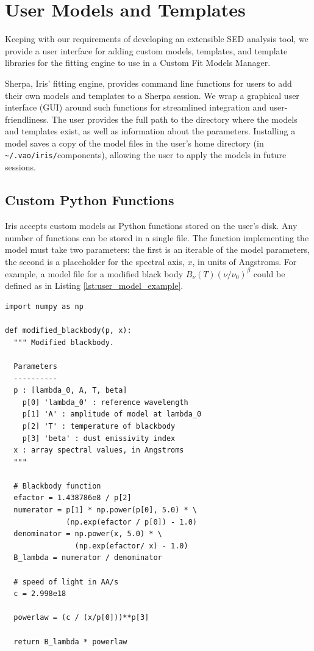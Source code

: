 \documentclass[preprint,authoryear,5p]{elsarticle}
\begin{document}
\section{User Models and Templates} \label{sec:usermodels}

Keeping with our requirements of developing an extensible SED analysis tool, we
provide a user interface for adding custom models, templates, and template
libraries for the fitting engine to use in a Custom Fit Models Manager.

\begin{sloppypar}
Sherpa, Iris' fitting engine, provides command line functions for users to add
their own models and templates to a Sherpa session. We wrap a graphical user 
interface (GUI) around such functions for streamlined integration and 
user-friendliness.
The user provides the full path to the directory where the models and templates
exist, as well as information about the parameters. Installing a model saves a
copy of the model files in the user's home directory (in
\texttt{\~{}/.vao/iris/}components), allowing the user to apply the models in future
sessions.
\end{sloppypar}

\subsection{Custom Python Functions} Iris accepts custom models as Python
functions stored on the user's disk. Any number of functions can be stored in a
single file. The function implementing the model must take two parameters: the
first is an iterable of the model parameters, the second is a placeholder for
the spectral axis, $x$, in units of Angstroms. For example, a model file for a
modified black body \(B_{\nu}(T) \left(\nu/\nu_{0}\right)^{\beta}\) could be
defined as in Listing \ref{lst:user_model_example}.

\begin{lstlisting}[style=python,
	caption={Example of a user-defined model that
can be dynamically loaded into Iris. The code, written as a Python function, 
implements a modified blackbody and can be combined 
in Iris with other built-in and custom components. Backslashes indicate line 
continuations.},
	label=lst:user_model_example]
import numpy as np

def modified_blackbody(p, x):
  """ Modified blackbody.

  Parameters
  ----------
  p : [lambda_0, A, T, beta]
    p[0] 'lambda_0' : reference wavelength
    p[1] 'A' : amplitude of model at lambda_0
    p[2] 'T' : temperature of blackbody
    p[3] 'beta' : dust emissivity index
  x : array spectral values, in Angstroms
  """

  # Blackbody function
  efactor = 1.438786e8 / p[2]
  numerator = p[1] * np.power(p[0], 5.0) * \
              (np.exp(efactor / p[0]) - 1.0)
  denominator = np.power(x, 5.0) * \
                (np.exp(efactor/ x) - 1.0)
  B_lambda = numerator / denominator

  # speed of light in AA/s
  c = 2.998e18

  powerlaw = (c / (x/p[0]))**p[3]

  return B_lambda * powerlaw
\end{lstlisting}
\end{document}
